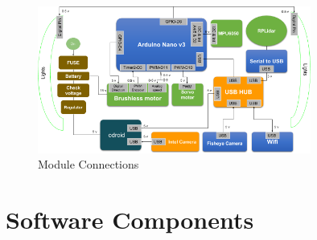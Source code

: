 \begin{figure}
	\centering
	\includegraphics[width=0.8\textwidth]{Images/platform/hardware_Connections.png}
	\caption{Module Connections}
	\label{moduleconnections}
\end{figure}

\section{Software Components}




